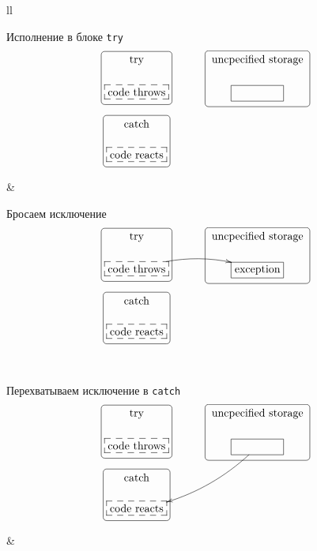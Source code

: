 \begin{center}
\resetgitem
\begin{tabular}{ll}
{
\begin{minipage}[\baselineskip]{8cm}
\gitem Исполнение в блоке \verb"try"
\[
\xymatrix@R=15pt@C=15pt{
  {\text{try}}
 	{
	\save
   [].[d]*+[F-:<3pt>]\frm{}
   \restore
	}
  &{}&{\text{uncpecified storage}}
   	{
	\save
   [].[d]*+[F-:<3pt>]\frm{}
   \restore
	}
  \\
  {\text{code throws}}
       	{
	\save
   [].[]*[F--]\frm{}
   \restore
	}
  &{}&{\phantom{\text{exception}}}
   	{
	\save
   [].[]*[F-]\frm{}
   \restore
	}
  \\
  {\text{catch}}
   	{
	\save
   [].[d]*+[F-:<3pt>]\frm{}
   \restore
	}
  &{}&{}\\
  {\text{code reacts}}
     	{
	\save
   [].[]*[F--]\frm{}
   \restore
	}
  &{}&{}\\
}
\]
\end{minipage}
}&{
\begin{minipage}[\baselineskip]{8cm}
\gitem  Бросаем исключение
\[
\xymatrix@R=15pt@C=15pt{
  {\text{try}}
 	{
	\save
   [].[d]*+[F-:<3pt>]\frm{}
   \restore
	}
  &{}&{\text{uncpecified storage}}
   	{
	\save
   [].[d]*+[F-:<3pt>]\frm{}
   \restore
	}
  \\
  {\text{code throws}}\ar@/^10pt/[rr]
       	{
	\save
   [].[]*[F--]\frm{}
   \restore
	}
  &{}&{\text{exception}}
   	{
	\save
   [].[]*[F-]\frm{}
   \restore
	}
  \\
  {\text{catch}}
   	{
	\save
   [].[d]*+[F-:<3pt>]\frm{}
   \restore
	}
  &{}&{}\\
  {\text{code reacts}}
     	{
	\save
   [].[]*[F--]\frm{}
   \restore
	}
  &{}&{}\\
}
\]
\end{minipage}
}\\\noalign{\medskip}
{
\begin{minipage}[\baselineskip]{8cm}
\gitem Перехватываем исключение в \verb"catch"
\[
\xymatrix@R=15pt@C=15pt{
  {\text{try}}
 	{
	\save
   [].[d]*+[F-:<3pt>]\frm{}
   \restore
	}
  &{}&{\text{uncpecified storage}}
   	{
	\save
   [].[d]*+[F-:<3pt>]\frm{}
   \restore
	}
  \\
  {\text{code throws}}
       	{
	\save
   [].[]*[F--]\frm{}
   \restore
	}
  &{}&{\phantom{\text{exception}}}
  \ar@/^10pt/[ddll]
   	{
	\save
   [].[]*[F-]\frm{}
   \restore
	}
  \\
  {\text{catch}}
   	{
	\save
   [].[d]*+[F-:<3pt>]\frm{}
   \restore
	}
  &{}&{}\\
  {\text{code reacts}}
     	{
	\save
   [].[]*[F--]\frm{}
   \restore
	}
  &{}&{}\\
}
\]
\end{minipage}
}&{
\begin{minipage}[\baselineskip]{8cm}
\end{minipage}
}\\
\end{tabular}
\end{center}

